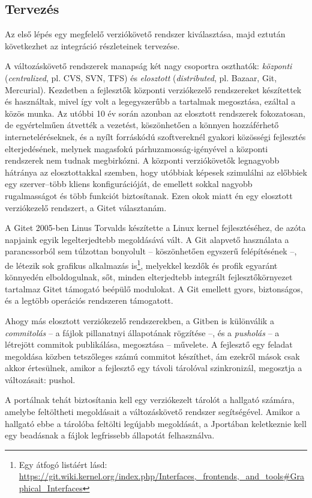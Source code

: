 \subsection{Tervezés}
Az első lépés egy megfelelő verziókövető rendszer kiválasztása, majd eztután következhet az integráció részleteinek tervezése.

A változáskövető rendszerek manapság két nagy csoportra oszthatók: \textit{központi} (\textit{centralized}, pl. CVS, SVN, TFS) és \textit{elosztott} (\textit{distributed}, pl. Bazaar, Git, Mercurial).
Kezdetben a fejlesztők központi verziókezelő rendszereket készítettek és használtak, mivel így volt a legegyszerűbb a tartalmak megosztása, ezáltal a közös munka.
Az utóbbi 10 év során azonban az elosztott rendszerek fokozatosan, de egyértelműen átvették a vezetést, köszönhetően a könnyen hozzáférhető interneteléréseknek, és a nyílt forráskódú szoftvereknél gyakori közösségi fejlesztés elterjedésének, melynek magasfokú párhuzamosság-igényével a központi rendszerek nem tudnak megbirkózni.
A központi verziókövetők legnagyobb hátránya az elosztottakkal szemben, hogy utóbbiak képesek szimulálni az előbbiek egy szerver--több kliens konfigurációját, de emellett sokkal nagyobb rugalmasságot és több funkciót biztosítanak.
Ezen okok miatt én egy elosztott verziókezelő rendszert, a Gitet választanám.

A Gitet 2005-ben Linus Torvalds készítette a Linux kernel fejlesztéséhez, de azóta napjaink egyik legelterjedtebb megoldásává vált.
A Git alapvető használata a parancssorból sem túlzottan bonyolult -- köszönhetően egyszerű felépítésének --, de létezik sok grafikus alkalmazás is\footnote{Egy átfogó listáért lásd: \url{https://git.wiki.kernel.org/index.php/Interfaces,\_frontends,\_and\_tools\#Graphical\_Interfaces}}, melyekkel kezdők és profik egyaránt könnyedén elboldogulnak, sőt, minden elterjedtebb integrált fejlesztőkörnyezet tartalmaz Gitet támogató beépülő modulokat.
A Git emellett gyors, biztonságos, és a legtöbb operációs rendszeren támogatott.

Ahogy más elosztott verziókezelő rendszerekben, a Gitben is különválik a \textit{commitolás} -- a fájlok pillanatnyi állapotának rögzítése --, és a \textit{pusholás} -- a létrejött commitok publikálása, megosztása -- művelete.
A fejlesztő egy feladat megoldása közben tetszőleges számú commitot készíthet, ám ezekről mások csak akkor értesülnek, amikor a fejlesztő egy távoli tárolóval szinkronizál, megosztja a változásait: pushol.

A portálnak tehát biztosítania kell egy verziókezelt tárolót a hallgató számára, amelybe feltöltheti megoldásait a változáskövető rendszer segítségével.
Amikor a hallgató ebbe a tárolóba feltölti legújabb megoldását, a Jportában keletkeznie kell egy beadásnak a fájlok legfrissebb állapotát felhasználva.

